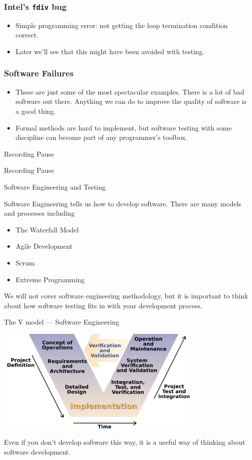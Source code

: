 \documentclass{beamer}
\begin{document}
\begin{frame}
  \frametitle{Intel's {\tt fdiv} bug}
  \begin{itemize}
  \item Simple programming error: not getting the loop termination
    condition correct.
  \item Later we'll see that this might have been avoided with testing.
  \end{itemize}
\end{frame}
\begin{frame}
  \frametitle{Software Failures}
  \begin{itemize}
  \item These are just some of the most spectacular examples. There is
    a lot of bad software out there. Anything we can do to
    improve the quality of software is a good thing. 
  \item  Formal methods are hard to implement, but
    software testing with some discipline can become part of any
    programmer's toolbox.
  \end{itemize}
\end{frame}

\begin{frame}{Recording Pause}
  \begin{center}
    Recording Pause
  \end{center}
\end{frame}
\begin{frame}{Software Engineering and Testing}

Software Engineering tells us how to develop software. There are many
models and processes including
\begin{itemize}
\item The Waterfall Model
\item Agile Development
\item Scrum
\item Extreme Programming 
\end{itemize}
 We will not cover software engineering methodology, but it is
 important to think about how software testing fits in with your
 development process. 
\end{frame}
\begin{frame}{The V model --- Software Engineering}

\begin{center} 
 \includegraphics[height=2in,width=4in]{V_model.png}
\end{center}
Even if you don't develop software this way, it is a useful way of
thinking about software development.
\end{frame}
\end{document}
